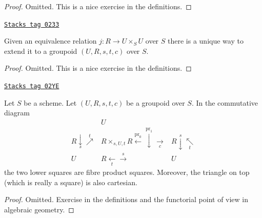 \begin{proof}
Omitted.
This is a nice exercise in the definitions.
\end{proof}

\begin{lemma}
\label{groupoids-lemma-equivalence-groupoid}
\href{https://stacks.math.columbia.edu/tag/0233}{\texttt{Stacks tag 0233}}

Given an equivalence relation $j : R \to U \times_S U$ over $S$
there is a unique way to extend it to a groupoid
$(U, R, s, t, c)$ over $S$.
\end{lemma}

\begin{proof}
Omitted.
This is a nice exercise in the definitions.
\end{proof}

\begin{lemma}[Diagram]
\label{groupoids-lemma-diagram}
\href{https://stacks.math.columbia.edu/tag/02YE}{\texttt{Stacks tag 02YE}}

Let $S$ be a scheme.
Let $(U, R, s, t, c)$ be a groupoid over $S$.
In the commutative diagram
$$
\begin{array}{ccc} & U &  \\ R \underset{s}{\downarrow}\overset{t}{\nearrow} & R \times_{s, U, t} R
\overset{\text{pr}_0}{\longleftarrow}\overset{\text{pr}_1}{\downarrow}\underset{c}{\longrightarrow} & R \overset{s}{\downarrow}\underset{t}{\nwarrow} \\ U & R \underset{t}{\longleftarrow}\overset{s}{\longrightarrow} & U\end{array}
$$
the two lower squares are fibre product squares.
Moreover, the triangle on top (which is really a square)
is also cartesian.
\end{lemma}

\begin{proof}
Omitted.
Exercise in the definitions and the functorial point of
view in algebraic geometry.
\end{proof}

